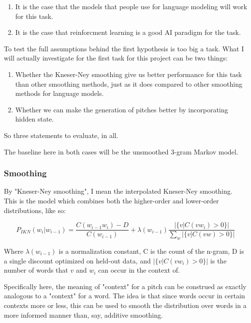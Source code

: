 \documentclass{article}
\begin{document}
\begin{enumerate}
    \item It is the case that the models that people use for language modeling will work for this task.
    \item It is the case that reinforcment learning is a good AI paradigm for the task.
\end{enumerate}

To test the full assumptions behind the first hypothesis is too big a task. What I will actually investigate for the first task for this project can be two things:

\begin{enumerate}
    \item Whether the Kneser-Ney smoothing give us better performance for this task than other smoothing methods, just as it does compared to other smoothing methods for language models.
    \item Whether we can make the generation of pitches better by incorporating hidden state.
\end{enumerate}

So three statements to evaluate, in all.

The baseline here in both cases will be the unsmoothed 3-gram Markov model. 

\subsubsection*{Smoothing}

By "Kneser-Ney smoothing", I mean the interpolated Kneser-Ney smoothing\cite{KneserNey}. This is the model which combines both the higher-order and lower-order distributions, like so:

$$P_{IKN}(w_i | w_{i-1}) = \frac{C(w_{i-1}w_i) - D}{C(w_{i-1})} + \lambda (w_{i-1}) \frac{|\{v | C(vw_i) > 0 \}|}{\sum_w |\{v|C(vw) > 0\}|}$$

Where $\lambda(w_{i-1})$ is a normalization constant, C is the count of the n-gram, D is a single discount optimized on held-out data, and $|\{v|C(vw_i) > 0\}|$ is the number of words that $v$ and $w_i$ can occur in the context of.

Specifically here, the meaning of "context" for a pitch can be construed as exactly analogous to a "context" for a word. The idea is that since words occur in certain contexts more or less, this can be used to smooth the distribution over words in a more informed manner than, say, additive smoothing.
\end{document}
